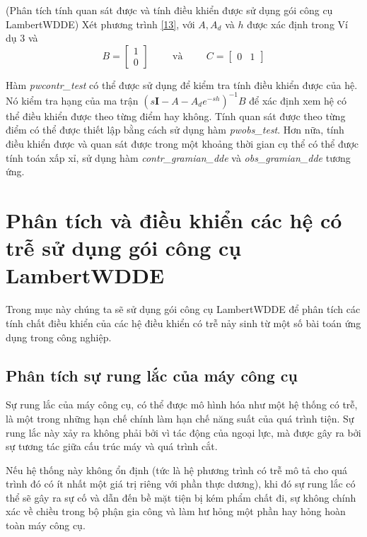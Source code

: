 \begin{vd} (Phân tích tính quan sát được và tính điều khiển được sử dụng gói công cụ LambertWDDE)
Xét phương trình \eqref{13}, với $A,A_d$ và $h$  được xác định trong Ví dụ 3 và
	\begin{equation*}
	B=\begin{bmatrix}
	1\\
	0
	\end{bmatrix}
	\hspace{1cm}
	\text{và}
	\hspace{1cm}
	C=\begin{bmatrix}
	0&1
	\end{bmatrix}
	\end{equation*}
\end{vd}
%
Hàm \textit{pwcontr\_test} có thể được sử dụng để kiểm tra tính điều khiển được của hệ. Nó kiểm tra hạng của ma trận $(s\mathbf{I}-A-A_de^{-sh})^{-1}B$ để xác định xem hệ có thể điều khiển được theo từng điểm hay không. Tính quan sát được theo từng điểm có thể được thiết lập bằng cách sử dụng hàm \textit{pwobs\_test}. Hơn nữa, tính điều khiển được và quan sát được trong một khoảng thời gian cụ thể có thể được tính toán xấp xỉ, sử dụng hàm \textit{ contr\_gramian\_dde} và \textit{obs\_gramian\_dde} tương ứng.


\section{Phân tích và điều khiển các hệ có trễ sử dụng gói công cụ LambertWDDE}
Trong mục này chúng ta sẽ sử dụng gói công cụ LambertWDDE để phân tích các tính chất điều khiển của các hệ điều khiển có trễ nảy sinh từ một số bài toán ứng dụng trong công nghiệp.

\subsection{Phân tích sự rung lắc của máy công cụ}

Sự rung lắc của máy công cụ, có thể được mô hình hóa như một hệ thống có trễ, là một trong những hạn chế chính làm hạn chế năng suất của quá trình tiện. Sự rung lắc này xảy ra không phải bởi vì tác động của ngoại lực, mà được gây ra bởi sự tương tác giữa cấu trúc máy và quá trình cắt. 


Nếu hệ thống này không ổn định (tức là hệ phương trình có trễ mô tả cho quá trình đó có ít nhất một giá trị riêng với phần thực dương), khi đó sự rung lắc có thể sẽ gây ra sự cố và dẫn đến bề mặt tiện bị kém phẩm chất đi, sự không chính xác về chiều trong bộ phận gia công và làm hư hỏng một phần hay hỏng hoàn toàn máy công cụ.

